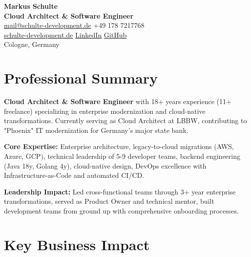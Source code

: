 \documentclass[11pt,a4paper]{article}
\begin{document}
\begin{center}
{\huge \textbf{Markus Schulte}}\\[4pt]
{\large \textbf{Cloud Architect \& Software Engineer}}\\[8pt]
\href{mailto:mail@schulte-development.de}{mail@schulte-development.de} \textbar{} +49 178 7217768\\
\href{https://schulte-development.de}{schulte-development.de} \textbar{} \href{https://linkedin.com/in/markus-schulte}{LinkedIn} \textbar{} \href{https://github.com/SchulteDev}{GitHub}\\
Cologne, Germany
\end{center}

\section{Professional Summary}

\textbf{Cloud Architect \& Software Engineer} with 18+ years experience (11+ freelance) specializing in enterprise modernization and cloud-native transformations. Currently serving as Cloud Architect at LBBW, contributing to "Phoenix" IT modernization for Germany's major state bank.

\textbf{Core Expertise:} Enterprise architecture, legacy-to-cloud migrations (AWS, Azure, GCP), technical leadership of 5-9 developer teams, backend engineering (Java 18y, Golang 4y), cloud-native design, DevOps excellence with Infrastructure-as-Code and automated CI/CD.

\textbf{Leadership Impact:} Led cross-functional teams through 3+ year enterprise transformations, served as Product Owner and technical mentor, built development teams from ground up with comprehensive onboarding processes.

\section{Key Business Impact}
\end{document}
